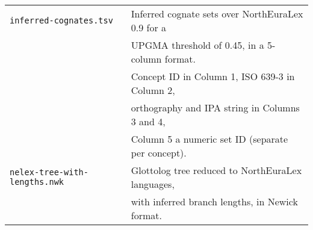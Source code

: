 \begin{center}
\begin{longtable}{ll}
 \hline
  \texttt{inferred-cognates.tsv} 
  & Inferred cognate sets over NorthEuraLex 0.9 for a\\
  & UPGMA threshold of 0.45, in a 5-column format.\\
  & Concept ID in Column 1, ISO 639-3 in Column 2,\\
  & orthography and IPA string in Columns 3 and 4,\\
  & Column 5 a numeric set ID (separate per concept).\\
 \hline
  \texttt{nelex-tree-with-lengths.nwk} 
  & Glottolog tree reduced to NorthEuraLex languages,\\
  & with inferred branch lengths, in Newick format.\\
\end{longtable}
\end{center}
